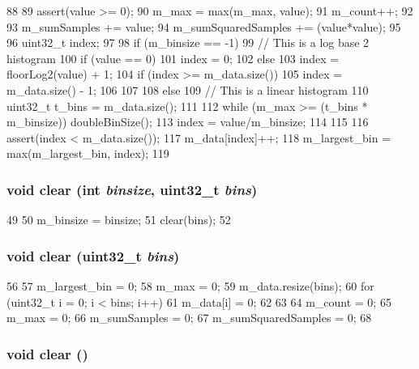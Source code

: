 \begin{DoxyCode}
88 {
89     assert(value >= 0);
90     m_max = max(m_max, value);
91     m_count++;
92 
93     m_sumSamples += value;
94     m_sumSquaredSamples += (value*value);
95 
96     uint32_t index;
97 
98     if (m_binsize == -1) {
99         // This is a log base 2 histogram
100         if (value == 0) {
101             index = 0;
102         } else {
103             index = floorLog2(value) + 1;
104             if (index >= m_data.size()) {
105                 index = m_data.size() - 1;
106             }
107         }
108     } else {
109         // This is a linear histogram
110         uint32_t t_bins = m_data.size();
111 
112         while (m_max >= (t_bins * m_binsize)) doubleBinSize();
113         index = value/m_binsize;
114     }
115 
116     assert(index < m_data.size());
117     m_data[index]++;
118     m_largest_bin = max(m_largest_bin, index);
119 }
\end{DoxyCode}
\hypertarget{classHistogram_af93bb19bb9a576789fa3bd81bed3d26e}{
\subsubsection[{clear}]{\setlength{\rightskip}{0pt plus 5cm}void clear (int {\em binsize}, \/  {\bf uint32\_\-t} {\em bins})}}
\label{classHistogram_af93bb19bb9a576789fa3bd81bed3d26e}



\begin{DoxyCode}
49 {
50     m_binsize = binsize;
51     clear(bins);
52 }
\end{DoxyCode}
\hypertarget{classHistogram_ab376d229b7b9b610068bb5bb8150c3b2}{
\subsubsection[{clear}]{\setlength{\rightskip}{0pt plus 5cm}void clear ({\bf uint32\_\-t} {\em bins})}}
\label{classHistogram_ab376d229b7b9b610068bb5bb8150c3b2}



\begin{DoxyCode}
56 {
57     m_largest_bin = 0;
58     m_max = 0;
59     m_data.resize(bins);
60     for (uint32_t i = 0; i < bins; i++) {
61         m_data[i] = 0;
62     }
63 
64     m_count = 0;
65     m_max = 0;
66     m_sumSamples = 0;
67     m_sumSquaredSamples = 0;
68 }
\end{DoxyCode}
\hypertarget{classHistogram_ac8bb3912a3ce86b15842e79d0b421204}{
\subsubsection[{clear}]{\setlength{\rightskip}{0pt plus 5cm}void clear ()}}
\label{classHistogram_ac8bb3912a3ce86b15842e79d0b421204}



